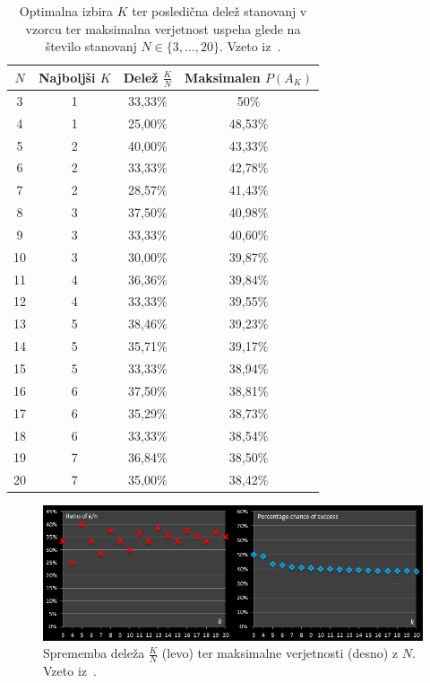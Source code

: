\documentclass[a4paper, 12pt, titlepage]{article}
\begin{document}
\begin{table}[!ht]
    \centering
    \small
    \begin{tabular}[h]{|c|c|c|c|}
        \hline $N$ & Najboljši $K$ & Delež $\frac{K}{N}$ & Maksimalen $P(A_{K})$ \\
        \hline 3 & 1 & 33,33\% & 50\% \\
        \hline 4 & 1 & 25,00\% & 48,53\% \\
        \hline 5 & 2 & 40,00\% & 43,33\% \\
        \hline 6 & 2 & 33,33\% & 42,78\% \\
        \hline 7 & 2 & 28,57\% & 41,43\% \\
        \hline 8 & 3 & 37,50\% & 40,98\% \\
        \hline 9 & 3 & 33,33\% & 40,60\% \\
        \hline 10 & 3 & 30,00\% & 39,87\% \\
        \hline 11 & 4 & 36,36\% & 39,84\% \\
        \hline 12 & 4 & 33,33\% & 39,55\% \\
        \hline 13 & 5 & 38,46\% & 39,23\% \\
        \hline 14 & 5 & 35,71\% & 39,17\% \\
        \hline 15 & 5 & 33,33\% & 38,94\% \\
        \hline 16 & 6 & 37,50\% & 38,81\% \\
        \hline 17 & 6 & 35,29\% & 38,73\% \\
        \hline 18 & 6 & 33,33\% & 38,54\% \\
        \hline 19 & 7 & 36,84\% & 38,50\% \\
        \hline 20 & 7 & 35,00\% & 38,42\% \\
        \hline
    \end{tabular}
    \caption{Optimalna izbira $K$ ter posledična delež stanovanj v vzorcu ter maksimalna verjetnost uspeha glede na število stanovanj $N \in \{3,\ldots,20\}$. Vzeto iz~\cite{secretary_puzzle}.}
    \label{tabela_z_verjetnostmi2}
\end{table}

\begin{figure}
    \centering
    \includegraphics[scale=0.78]{slike/graf_delez_verjetnost.png}
    \caption{Sprememba deleža $\frac{K}{N}$ (levo) ter maksimalne verjetnosti (desno) z $N$. Vzeto iz~\cite{secretary_puzzle}.}
    \label{graf_delez_verjetnost}
\end{figure}
\end{document}
